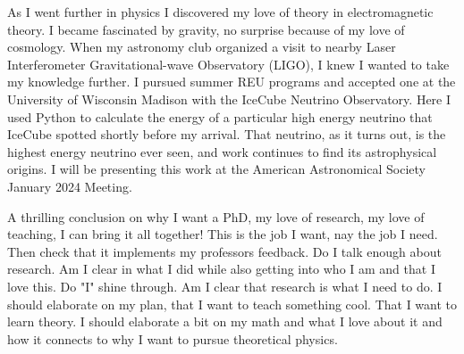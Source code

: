 \documentclass[a4paper, 12pt]{article}
\begin{document}
As I went further in physics I discovered my love of theory in electromagnetic theory. I became fascinated by gravity, no surprise because of my love of cosmology. When my astronomy club organized a visit to nearby Laser Interferometer Gravitational-wave Observatory (LIGO), I knew I wanted to take my knowledge further. I pursued summer REU programs and accepted one at the University of Wisconsin Madison with the IceCube Neutrino Observatory. Here I used Python to calculate the energy of a particular high energy neutrino that IceCube spotted shortly before my arrival. That neutrino, as it turns out, is the highest energy neutrino ever seen, and work continues to find its astrophysical origins. I will be presenting this work at the American Astronomical Society January 2024 Meeting.

A thrilling conclusion on why I want a PhD, my love of research, my love of teaching, I can bring it all together! This is the job I want, nay the job I need. Then check that it implements my professors feedback. Do I talk enough about research. Am I clear in what I did while also getting into who I am and that I love this. Do "I" shine through. Am I clear that research is what I need to do. I should elaborate on my plan, that I want to teach something cool. That I want to learn theory. I should elaborate a bit on my math and what I love about it and how it connects to why I want to pursue theoretical physics.

\end{document}
